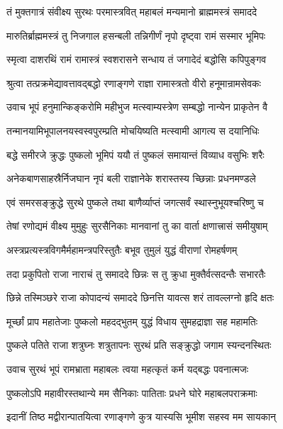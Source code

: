 \twolineshloka
{तं मुक्तगात्रं संवीक्ष्य सुरथः परमास्त्रवित्}
{महाबलं मन्यमानो ब्राह्ममस्त्रं समाददे}%

\twolineshloka
{मारुतिर्ब्राह्ममस्त्रं तु निजगाल हसन्बली}
{तन्निगीर्णं नृपो दृष्ट्वा रामं सस्मार भूमिपः}%

\twolineshloka
{स्मृत्वा दाशरथिं रामं रामास्त्रं स्वशरासने}
{सन्धाय तं जगादेदं बद्धोसि कपिपुङ्गव}%

\twolineshloka
{श्रुत्वा तत्प्रक्रमेद्यावत्तावद्बद्धो रणाङ्गणे}
{राज्ञा रामास्त्रतो वीरो हनूमान्रामसेवकः}%

\twolineshloka
{उवाच भूपं हनुमान्किङ्करोमि महीभुज}
{मत्स्वाम्यस्त्रेण सम्बद्धो नान्येन प्राकृतेन वै}%

\twolineshloka
{तन्मानयामिभूपालनयस्वस्वपुरम्प्रति}
{मोचयिष्यति मत्स्वामी आगत्य स दयानिधिः}%

\twolineshloka
{बद्धे समीरजे क्रुद्धः पुष्कलो भूमिपं ययौ}
{तं पुष्कलं समायान्तं विव्याध वसुभिः शरैः}%

\twolineshloka
{अनेकबाणसाहस्रैर्निजघान नृपं बली}
{राज्ञानेके शरास्तस्य च्छिन्नाः प्रधनमण्डले}%

\twolineshloka
{एवं समरसङ्क्रुद्धे सुरथे पुष्कले तथा}
{बाणैर्व्याप्तं जगत्सर्वं स्थास्नुभूयश्चरिष्णु च}%

\twolineshloka
{तेषां रणोद्यमं वीक्ष्य मुमुहुः सुरसैनिकाः}
{मानवानां तु का वार्ता क्षणात्त्रासं समीयुषाम्}%

\twolineshloka
{अस्त्रप्रत्यस्त्रविगमैर्महामन्त्रपरिस्तुतैः}
{बभूव तुमुलं युद्धं वीराणां रोमहर्षणम्}%

\twolineshloka
{तदा प्रकुपितो राजा नाराचं तु समाददे}
{छिन्नः स तु क्रुधा मुक्तैर्वत्सदन्तैः सभारतैः}%

\twolineshloka
{छिन्ने तस्मिञ्छरे राजा कोपादन्यं समाददे}
{छिनत्ति यावत्स शरं तावल्लग्नो हृदि क्षतः}%

\twolineshloka
{मूर्च्छां प्राप महातेजाः पुष्कलो महदद्भुतम्}
{युद्धं विधाय सुमहद्राज्ञा सह महामतिः}%

\twolineshloka
{पुष्कले पतिते राजा शत्रुघ्नः शत्रुतापनः}
{सुरथं प्रति सङ्क्रुद्धो जगाम स्यन्दनस्थितः}%

\twolineshloka
{उवाच सुरथं भूपं रामभ्राता महाबलः}
{त्वया महत्कृतं कर्म यद्बद्धः पवनात्मजः}%

\twolineshloka
{पुष्कलोऽपि महावीरस्तथान्ये मम सैनिकाः}
{पातिताः प्रधने घोरे महाबलपराक्रमाः}%

\twolineshloka
{इदानीं तिष्ठ मद्वीरान्पातयित्वा रणाङ्गणे}
{कुत्र यास्यसि भूमीश सहस्व मम सायकान्}%

